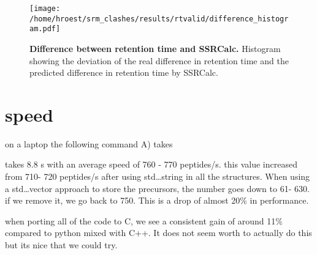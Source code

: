 \begin{figure}
\texttt{[image: /home/hroest/srm\_clashes/results/rtvalid/difference\_histogram.pdf]}
\caption{ \textbf{Difference between retention time and SSRCalc.}
Histogram showing the deviation of the real difference in retention time and
the predicted difference in retention time by SSRCalc. }
\label{fig:DiffHist}
\end{figure}


\section{speed}

on a laptop the following command A) takes


takes 8.8 s with an average speed of 760 - 770 peptides/s. this value
increased from 710- 720
peptides/s after using std\dots string in all the structures. 
When using a std\dots vector approach to store the precursors, the number goes
down to 61- 630. if we remove it, we go back to 750. This is a drop of almost
20\% in performance.



when porting all of the code to C, we see a consistent gain of around 11\%
compared to python mixed with C++. It does not seem worth to actually do this
but its nice that we could try.



